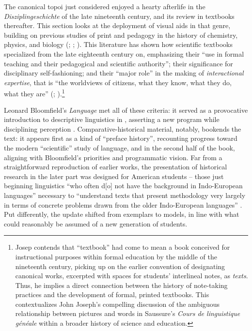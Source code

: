 \documentclass[output=paper]{langscibook}
\begin{document}
The canonical topoi just considered enjoyed a hearty afterlife in the \emph{Disziplin\-geschichte} of the late nineteenth century, and its review in textbooks thereafter. This section looks at the deployment of visual aids in that genre, building on previous studies of print and pedagogy in the history of chemistry, physics, and biology (\citealt{bertomeusanchez2002}; \citealt{Kuhn1962}; \citealt{Hopwood2015}). This literature has shown how scientific textbooks specialized from the late eighteenth century on, emphasizing their ``use in formal teaching and their pedagogical and scientific authority''; their significance for disciplinary self-fashioning; and their ``major role'' in the making of \emph{interactional expertise}, that is ``the worldviews of citizens, what they know, what they do, what they are'' (\citealt[475, 479]{Simon2016}; \citealt[406--408]{Johns1998}).\footnote{Josep \citet{Simon2016} contends that ``textbook'' had come to mean a book conceived for instructional purposes within formal education by the middle of the nineteenth century, picking up on the earlier convention of designating canonical works, excerpted with spaces for students' interlineal notes, as \emph{texts}. Thus, he implies a direct connection between the history of note-taking practices and the development of formal, printed textbooks. This contextualizes John Joseph's compelling \citeyear{Joseph2017} discussion of the ambiguous relationship between pictures and words in Saussure's \emph{Cours de linguistique généale} within a broader history of science and education.}

Leonard Bloomfield's \emph{Language} met all of these criteria: it served as a provocative introduction to descriptive linguistics in \citeyear{Bloomfield1933}, asserting a new program while disciplining perception \citep[v-vi]{BloomfieldHoijer1965}. Comparative-historical material, notably, bookends the text: it appears first as a kind of ``preface history'', recounting progress toward the modern ``scientific'' study of language, and in the second half of the book, aligning with Bloomfield's priorities and programmatic vision. Far from a straightforward reproduction of earlier works, the presentation of historical research in the later part was designed for American students -- those just beginning linguistics ``who often d[o] not have the background in Indo-European languages'' necessary to ``understand texts that present methodology very largely in terms of concrete problems drawn from the older Indo-European languages'' \citep[vi]{BloomfieldHoijer1965}. Put differently, the update shifted from exemplars to models, in line with what could reasonably be assumed of a new generation of students.
\end{document}
